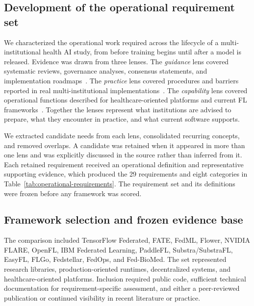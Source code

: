 \documentclass[preprint,5p, 10pt, times]{elsarticle}
\begin{document}
\subsection*{Development of the operational requirement set}

We characterized the operational work required across the lifecycle of a
multi-institutional health AI study, from before training begins until after
a model is released. Evidence was drawn from three lenses. The \textit{guidance} lens covered systematic reviews, governance analyses, consensus statements, and implementation roadmaps~\cite{teo2024federated,li2025challenges,eden2025scoping,kommusaar2025roadmap}. The \textit{practice} lens covered procedures and barriers reported in real multi-institutional implementations~\cite{pati2022federated,bujotzek2025real,peltonen2026federated,schoenpflug2025navigating}. The \textit{capability} lens covered operational functions described for healthcare-oriented platforms and current FL frameworks~\cite{cremonesi2025fed,mullie2024coda,bottomly2026pragmatic,chavero2026federated}. Together the lenses represent what institutions are advised to prepare, what they encounter in practice, and what current software supports.

We extracted candidate needs from each lens, consolidated recurring
concepts, and removed overlaps. A candidate was retained when it appeared in
more than one lens and was explicitly discussed in the source rather than
inferred from it. Each retained requirement received an operational
definition and representative supporting evidence, which produced the 29
requirements and eight categories in Table~\ref{tab:operational-requirements}. The
requirement set and its definitions were frozen before any framework was
scored. 

\subsection*{Framework selection and frozen evidence base}
The comparison included TensorFlow Federated, FATE, FedML, Flower, NVIDIA FLARE, OpenFL, IBM Federated Learning, PaddleFL, Substra/SubstraFL, EasyFL, FLGo, Fedstellar, FedOps, and Fed-BioMed. The set represented research libraries, production-oriented runtimes, decentralized systems, and healthcare-oriented platforms. Inclusion required public code, sufficient technical documentation for requirement-specific assessment, and either a peer-reviewed publication or continued visibility in recent literature or practice.
\end{document}

